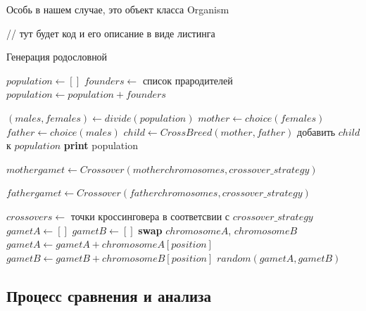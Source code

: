 \documentclass{matmex-diploma-custom}
\begin{document}
Особь в нашем случае, это объект класса Organism

// тут будет код и его описание в виде листинга

\begin{algorithm}
  \caption{Генерация родословной}
  \label{algo:pedogen}
  \begin{algorithmic}[1]
    \State $\mathit{population} \gets []$
    \State $\mathit{founders} \gets$ список прародителей
    \State $\mathit{population} \gets \mathit{population} + \mathit{founders}$

    \State $(\mathit{males}, \mathit{females}) \gets \mathit{divide}(\mathit{population})$
    \State $\mathit{mother} \gets \mathit{choice}(\mathit{females})$
    \State $\mathit{father} \gets \mathit{choice}(\mathit{males})$
    \State $\mathit{child} \gets \mathit{CrossBreed}(\mathit{mother}, \mathit{father})$
    \State добавить $\mathit{child}$ к $\mathit{population}$
    \EndFor
    \State \textbf{print} population
    \EndProcedure

    \State

    \State $\mathit{mother} \mathit{gamet} \gets
    \mathit{Crossover}(\mathit{mother} \mathit{chromosomes}, \mathit{crossover\_strategy})$

    \State $\mathit{father} \mathit{gamet} \gets
    \mathit{Crossover}(\mathit{father} \mathit{chromosomes}, \mathit{crossover\_strategy})$
    \EndFunction

    \State

    \State $\mathit{crossovers} \gets $ точки кроссинговера в
    соответсвии с $\mathit{crossover\_strategy}$
    \State $\mathit{gametA} \gets []$
    \State $\mathit{gametB} \gets []$
    \State \textbf{swap} $\mathit{chromosomeA}$, $\mathit{chromosomeB}$
    \State $\mathit{gametA} \gets \mathit{gametA} + \mathit{chromosomeA}[\mathit{position}]$
    \State $\mathit{gametB} \gets \mathit{gametB} + \mathit{chromosomeB}[\mathit{position}]$
    \EndIf
    \EndFor
    \State \Return $\mathit{random}(\mathit{gametA}, \mathit{gametB})$
    \EndFunction
  \end{algorithmic}
\end{algorithm}

\subsection{Процесс сравнения и анализа}
\end{document}
